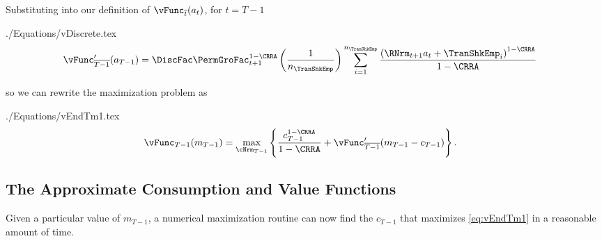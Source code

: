 \documentclass[titlepage, headings=optiontotocandhead]{\econtex}
\newcommand{\Mma}{\textit{Mathematica}}
\begin{document}
Substituting into our definition of $\vEOPt({a}_{t})$, for $t=T-1$
\begin{verbatimwrite}{./Equations/vDiscrete.tex}
  \begin{equation}\begin{gathered}\begin{aligned}
        \vFunc^{\prime}_{\overline{T-1}}({a}_{T-1})  & =   \DiscFac \PermGroFac_{t+1}^{1-\CRRA}\left(\frac{1}{n_{\TranShkEmp}}\right)\sum_{i=1}^{n_{\TranShkEmp}}   \frac{\left(\RNrm_{t+1} {a}_{t} + \TranShkEmp_{i}\right)^{1-\CRRA}}{1-\CRRA} \label{eq:vDiscrete}
      \end{aligned}\end{gathered}\end{equation}
\end{verbatimwrite}
\unskip
so we can rewrite the maximization problem as 
\begin{verbatimwrite}{./Equations/vEndTm1.tex}
  \begin{equation}\begin{gathered}\begin{aligned}
        {\vFunc}_{T-1}({m}_{T-1})   & = \max_{\cNrm_{T-1}}
        \left\{
          \frac{{c}_{T-1}^{1-\CRRA}}{1-\CRRA} +
          \vFunc^{\prime}_{\overline{T-1}}({m}_{T-1}-{c}_{T-1})
        \right\}.
        \label{eq:vEndTm1}
      \end{aligned}\end{gathered}\end{equation}
\end{verbatimwrite}
\unskip

\hypertarget{The-Approximate-Consumption-and-Value-Functions}{}
\subsection{The Approximate Consumption and Value Functions}

Given a particular value of ${m}_{T-1}$, a numerical maximization
routine can now find the ${c}_{T-1}$ that maximizes
\eqref{eq:vEndTm1} in a reasonable amount of time.%
\end{document}
